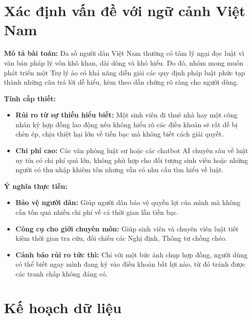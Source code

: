 \section{Xác định vấn đề với ngữ cảnh Việt Nam}

\textbf{Mô tả bài toán:} 
Đa số người dân Việt Nam thường có tâm lý ngại đọc luật vì văn bản pháp lý vốn khô khan, dài dòng và khó hiểu. Do đó, nhóm mong muốn phát triển một Trợ lý ảo có khả năng diễn giải các quy định pháp luật phức tạp thành những câu trả lời dễ hiểu, kèm theo dẫn chứng rõ ràng cho người dùng.

\hfill

\textbf{Tính cấp thiết:}
\begin{itemize}
    \item \textbf{Rủi ro từ sự thiếu hiểu biết:} Một sinh viên đi thuê nhà hay một công nhân ký hợp đồng lao động nếu không hiểu rõ các điều khoản sẽ rất dễ bị chèn ép, chịu thiệt hại lớn về tiền bạc mà không biết cách giải quyết.
    \item \textbf{Chi phí cao:} Các văn phòng luật sư hoặc các chatbot AI chuyên sâu về luật uy tín có chi phí quá lớn, không phù hợp cho đối tượng sinh viên hoặc những người có thu nhập khiêm tốn nhưng vẫn có nhu cầu tìm hiểu về luật.
\end{itemize}

\textbf{Ý nghĩa thực tiễn:}
\begin{itemize}
    \item \textbf{Bảo vệ người dân:} Giúp người dân bảo vệ quyền lợi của mình mà không cần tốn quá nhiều chi phí về cả thời gian lẫn tiền bạc.
    \item \textbf{Công cụ cho giới chuyên môn:} Giúp sinh viên và chuyên viên luật tiết kiệm thời gian tra cứu, đối chiếu các Nghị định, Thông tư chồng chéo.
    \item \textbf{Cảnh báo rủi ro tức thì:} Chỉ với một bức ảnh chụp hợp đồng, người dùng có thể biết ngay mình đang ký vào điều khoản bất lợi nào, từ đó tránh được các tranh chấp không đáng có.
\end{itemize}

\section{Kế hoạch dữ liệu}

